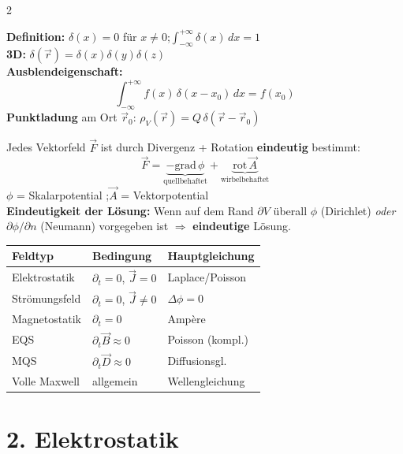 \documentclass[a4paper, 7.5pt]{extarticle}
\begin{document}
\begin{multicols*}{2}
\begin{tcolorbox}[title={Delta-Funktion $\delta(\vec{r})$ -- Punktquelle}]
\textbf{Definition:} $\delta(x)=0$ für $x\neq0$;\quad $\int_{-\infty}^{+\infty}\delta(x)\,dx=1$\\
\textbf{3D:} $\delta(\vec{r}) = \delta(x)\delta(y)\delta(z)$ \;\text{\textcolor{boxtitle}{[\(1/m^3\)]}}\\
\textbf{Ausblendeigenschaft:}
$$\int_{-\infty}^{+\infty} f(x)\,\delta(x-x_0)\,dx = f(x_0)$$
\textbf{Punktladung} am Ort $\vec{r}_0$:
$\rho_V(\vec{r}) = Q\,\delta(\vec{r}-\vec{r}_0)$ \;\text{\textcolor{boxtitle}{[\(C/m^3\)]}}
\end{tcolorbox}

\begin{tcolorbox}[title={Helmholtz-Theorem \& Eindeutigkeit}]
Jedes Vektorfeld $\vec{F}$ ist durch Divergenz + Rotation \textbf{eindeutig} bestimmt:
$$\vec{F} = \underbrace{-\text{grad}\,\phi}_{\text{quellbehaftet}} + \underbrace{\text{rot}\,\vec{A}}_{\text{wirbelbehaftet}}$$
$\phi$ = Skalarpotential \;\text{\textcolor{boxtitle}{[\(V\)]}};\quad $\vec{A}$ = Vektorpotential \;\text{\textcolor{boxtitle}{[\(Vs/m\)]}}\\[3pt]
\textbf{Eindeutigkeit der Lösung:} Wenn auf dem Rand $\partial V$ überall $\phi$ (Dirichlet) \textit{oder} $\partial\phi/\partial n$ (Neumann) vorgegeben ist $\Rightarrow$ \textbf{eindeutige} Lösung.
\end{tcolorbox}

\begin{tcolorbox}[title={Einteilung elektromagnetischer Felder}]
\begin{tabular}{@{}lll@{}}
\toprule
Feldtyp & Bedingung & Hauptgleichung\\
\midrule
Elektrostatik & $\partial_t=0$, $\vec{J}=0$ & Laplace/Poisson\\
Strömungsfeld & $\partial_t=0$, $\vec{J}\neq0$ & $\Delta\phi=0$\\
Magnetostatik & $\partial_t=0$ & Ampère\\
EQS & $\partial_t\vec{B}\approx0$ & Poisson (kompl.)\\
MQS & $\partial_t\vec{D}\approx0$ & Diffusionsgl.\\
Volle Maxwell & allgemein & Wellengleichung\\
\bottomrule
\end{tabular}
\end{tcolorbox}

\section*{2. Elektrostatik}


\end{multicols*}
\end{document}
